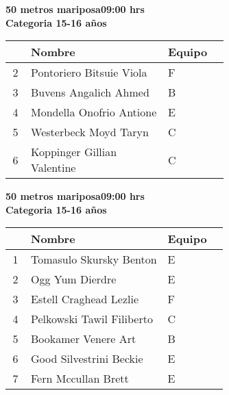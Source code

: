 \begin{minipage}{0.95\linewidth}\vspace{0.5cm} 
\begin{flushleft}
\textbf{
\hspace{-0.15cm}50 metros mariposa\hspace{1.5cm}09:00 hrs \\Categoria 15-16 años}\vspace{-0.2cm} 
\end{flushleft}
\begin{tabular}{cp{0.63\linewidth}l}
\hline
& \textbf{Nombre} & \textbf{Equipo} \\ \hline
2 & Pontoriero Bitsuie Viola & F \\ 
3 & Buvens Angalich Ahmed & B \\ 
4 & Mondella Onofrio Antione & E \\ 
5 & Westerbeck Moyd Taryn & C \\ 
6 & Koppinger Gillian Valentine & C \\ 
\end{tabular}
\end{minipage}
\begin{minipage}{0.95\linewidth}\vspace{0.5cm} 
\begin{flushleft}
\textbf{
\hspace{-0.15cm}50 metros mariposa\hspace{1.5cm}09:00 hrs \\Categoria 15-16 años}\vspace{-0.2cm} 
\end{flushleft}
\begin{tabular}{cp{0.63\linewidth}l}
\hline
& \textbf{Nombre} & \textbf{Equipo} \\ \hline
1 & Tomasulo Skursky Benton & E \\ 
2 & Ogg Yum Dierdre & E \\ 
3 & Estell Craghead Lezlie & F \\ 
4 & Pelkowski Tawil Filiberto & C \\ 
5 & Bookamer Venere Art & B \\ 
6 & Good Silvestrini Beckie & E \\ 
7 & Fern Mccullan Brett & E \\ 
\end{tabular}
\end{minipage}

